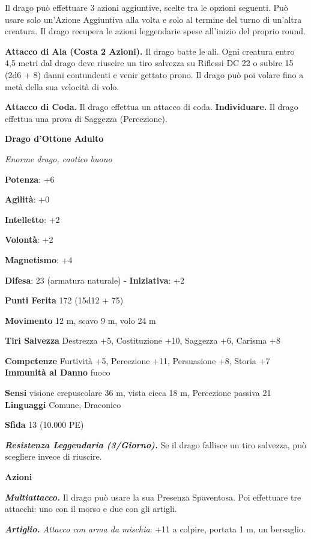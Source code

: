\begin{multicols}{2}
Il drago può effettuare 3 azioni aggiuntive, scelte tra le opzioni
seguenti. Può usare solo un'Azione Aggiuntiva alla volta e solo al
termine del turno di un'altra creatura. Il drago recupera le azioni
leggendarie spese all'inizio del proprio round.

\textbf{Attacco di Ala (Costa 2 Azioni).} Il drago batte le ali. Ogni
creatura entro 4,5 metri dal drago deve riuscire un tiro salvezza su Riflessi DC 22 o subire 15 (2d6 + 8) danni contundenti e venir gettato
prono. Il drago può poi volare fino a metà della sua velocità di volo.

\textbf{Attacco di Coda.} Il drago effettua un attacco di coda.
\textbf{Individuare.} Il drago effettua una prova di Saggezza
(Percezione).

\textbf{Drago d'Ottone Adulto}

\emph{Enorme drago, caotico buono}

\textbf{Potenza}: +6

\textbf{Agilità}: +0

\textbf{Intelletto}: +2

\textbf{Volontà}: +2

\textbf{Magnetismo}: +4

\textbf{Difesa}: 23 (armatura naturale) - \textbf{Iniziativa}: +2

\textbf{Punti Ferita} 172 (15d12 + 75)

\textbf{Movimento} 12 m, scavo 9 m, volo 24 m

\textbf{Tiri Salvezza} Destrezza +5, Costituzione +10, Saggezza +6,
Carisma +8

\textbf{Competenze} Furtività +5, Percezione +11, Persuasione +8, Storia +7
\textbf{Immunità al Danno} fuoco

\textbf{Sensi} visione crepuscolare 36 m, vista cieca 18 m, Percezione passiva
21 \textbf{Linguaggi} Comune, Draconico

\textbf{Sfida} 13 (10.000 PE)\smallskip

\emph{\textbf{Resistenza Leggendaria (3/Giorno).}} Se il drago fallisce
un tiro salvezza, può scegliere invece di riuscire.

\smallskip\textbf{Azioni}

\emph{\textbf{Multiattacco.}} Il drago può usare la sua Presenza
Spaventosa. Poi effettuare tre attacchi: uno con il morso e due con gli
artigli.

\emph{\textbf{Artiglio.} Attacco con arma da mischia}: +11 a colpire,
portata 1 m, un bersaglio.


\end{multicols}
